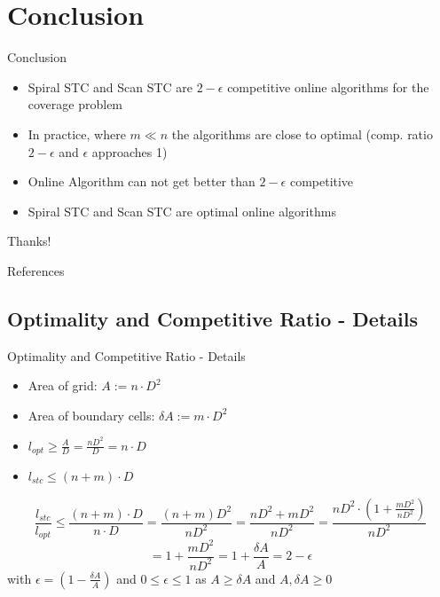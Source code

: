 \documentclass{beamer}
\begin{document}
\section{Conclusion}
\begin{frame}{Conclusion}
    \begin{itemize}
        \item Spiral STC and Scan STC are $2 - \epsilon$ competitive online algorithms for the coverage problem
        \item In practice, where $m \ll n$ the algorithms are close to optimal (comp. ratio $2 - \epsilon$ and $\epsilon$ approaches 1)
        \item Online Algorithm can not get better than $2 - \epsilon$ competitive
        \item Spiral STC and Scan STC are optimal online algorithms
    \end{itemize}
\end{frame}

\begin{frame}[focus]
    Thanks!
\end{frame}


\appendix

\begin{frame}{References}
    \nocite{*} %
    
    
\end{frame}

\subsection{Optimality and Competitive Ratio - Details}
\begin{frame}{Optimality and Competitive Ratio - Details}
    \begin{itemize}
        \item Area of grid: $A := n \cdot D^2$
        \item Area of boundary cells: $\delta A := m \cdot D^2$
        \item $l_{opt} \geq \frac{A}{D} = \frac{nD^2}{D} = n \cdot D$
        \item $l_{stc} \leq (n + m) \cdot D$
    \end{itemize}

    $$ \frac{l_{stc}}{l_{opt}} \leq \frac{(n+m) \cdot D}{n \cdot D} = \frac{(n + m) D^2}{n D^2} = \frac{nD^2 + mD^2}{nD^2} = \frac{nD^2 \cdot (1 + \frac{mD^2}{nD^2})}{nD^2}$$
    $$= 1 + \frac{mD^2}{nD^2} = 1 + \frac{\delta A}{A} = 2 - \epsilon$$
    with $\epsilon = (1 - \frac{\delta A}{A})$ and $0 \leq \epsilon \leq 1$ as $A \geq \delta A$ and $A, \delta A \geq 0$
\end{frame}
\end{document}
